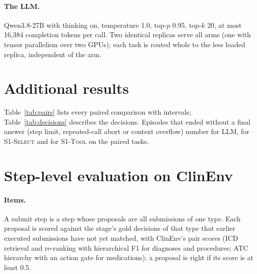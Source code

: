 \documentclass[11pt]{article}
\newcommand{\llm}{\textsc{LLM}}
\newcommand{\sel}{\textsc{S1-Select}}
\newcommand{\tool}{\textsc{S1-Tool}}
\begin{document}
\paragraph{The LLM.} Qwen3.8-27B with thinking on, temperature 1.0, top-$p$ 0.95, top-$k$ 20, at most 16,384 completion
tokens per call. Two identical replicas serve all arms (one with tensor parallelism over two GPUs); each task is routed
whole to the less loaded replica, independent of the arm.

\section{Additional results}\label{app:results}

\begin{table}[t]
\centering\small
\resizebox{\textwidth}{!}{}
\caption{Paired comparisons, each on the tasks both arms completed (run 1). $\Delta$ in points; per-type columns give
the point difference in checkpoint success.}
\label{tab:pairs}
\end{table}

\begin{table}[t]
\centering\small

\caption{\sel{} decisions, run 1. Distinct strings: steps whose five proposals are not all identical. Distinct
actions: after merging proposals with the same tools and key clinical arguments. Mean max $p$ and entropy (normalised
by $\log n$) describe the System One model's distribution where there was a choice. Departs: share of those steps where
it chose a proposal other than the LLM's first sample.}
\label{tab:decisions}
\end{table}

Table~\ref{tab:pairs} lists every paired comparison with intervals; Table~\ref{tab:decisions} describes the decisions.
Episodes that ended without a final answer (step limit, repeated-call abort or context overflow) number \ENDLLM{} for
\llm, \ENDSel{} for \sel{} and \ENDTool{} for \tool{} on the paired tasks.

\section{Step-level evaluation on ClinEnv}\label{app:clinenv}

\paragraph{Items.} A submit step is a step whose proposals are all submissions of one type. Each proposal is scored
against the stage's gold decisions of that type that earlier executed submissions have not yet matched, with
ClinEnv's pair scores (ICD retrieval and re-ranking with hierarchical F1 for diagnoses and procedures; ATC hierarchy
with an action gate for medications); a proposal is right if its score is at least 0.5.
\end{document}
